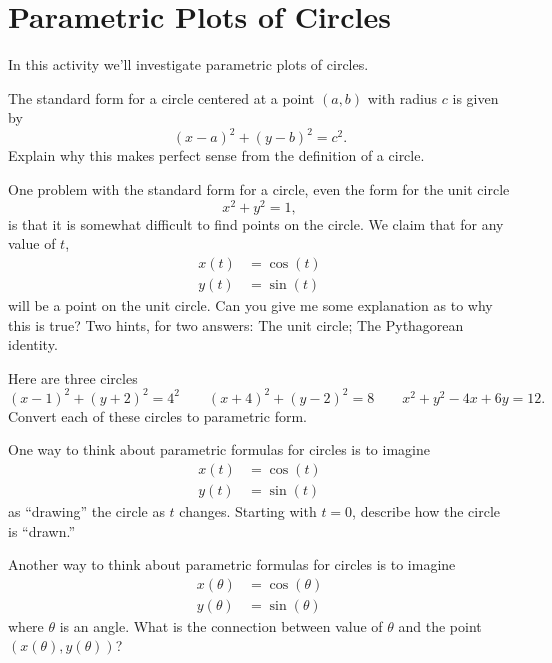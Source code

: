 
\newpage

\section{Parametric Plots of Circles}

In this activity we'll investigate parametric plots of circles.

\begin{prob} 
The standard form for a circle centered at a point $(a,b)$ with radius $c$ is given by
\[
(x-a)^2 + (y-b)^2 = c^2.
\]
Explain why this makes perfect sense from the definition of a circle. 
\end{prob} 


\begin{prob} 
One problem with the standard form for a circle, even the form for the unit circle
\[
x^2 + y^2 = 1,
\]
is that it is somewhat difficult to find points on the circle. We
claim that for any value of $t$,
\begin{align*}
x(t) &= \cos(t)\\
y(t) &= \sin(t) 
\end{align*}
will be a point on the unit circle. Can you give me some explanation
as to why this is true? Two hints, for two answers: The unit circle;
The Pythagorean identity.
\end{prob} 


\begin{prob}
Here are three circles
\[
(x-1)^2 + (y+2)^2 = 4^2 \qquad (x+4)^2 + (y-2)^2 = 8 \qquad x^2+y^2 -4x+6y= 12.
\]
Convert each of these circles to parametric form.
\end{prob}

\begin{prob}
One way to think about parametric formulas for circles is to imagine 
\begin{align*}
x(t) &= \cos(t)\\
y(t) &= \sin(t) 
\end{align*}
as ``drawing'' the circle as $t$ changes. Starting with $t=0$,
describe how the circle is ``drawn.''
\end{prob}

\begin{prob}
Another way to think about parametric formulas for circles is to imagine 
\begin{align*}
x(\theta) &= \cos(\theta)\\
y(\theta) &= \sin(\theta) 
\end{align*}
where $\theta$ is an angle. What is the connection between value of
$\theta$ and the point $(x(\theta), y(\theta))$?
\end{prob}

